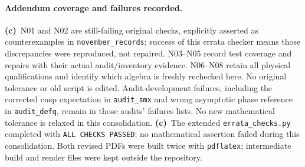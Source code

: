 \documentclass[11pt,a4paper]{article}
\newcommand{\C}{\textbf{(c)}\ }
\newcommand{\file}[1]{\nolinkurl{#1}}
\begin{document}
\paragraph{Addendum coverage and failures recorded.}
\C N01 and N02 are still-failing original checks, explicitly asserted as
counterexamples in \file{november_records}; success of this errata checker
means those discrepancies were reproduced, not repaired. N03--N05 record
test coverage and repairs with their actual audit/inventory evidence. N06--N08
retain all physical qualifications and identify which algebra is freshly
rechecked here. No original tolerance or old script is edited. Audit-development
failures, including the corrected cusp expectation in \file{audit_smx} and
wrong asymptotic phase reference in \file{audit_defq}, remain in those audits'
failures lists. No new mathematical tolerance is relaxed in this consolidation.
\C The extended \file{errata_checks.py} completed with
\texttt{ALL CHECKS PASSED}; no mathematical assertion failed during this
consolidation. Both revised PDFs were built twice with \file{pdflatex};
intermediate build and render files were kept outside the repository.
\end{document}
